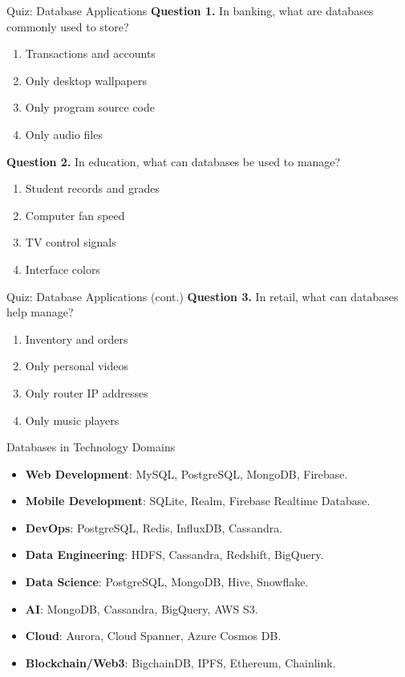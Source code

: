 \documentclass[aspectratio=169,11pt]{beamer}
\newcommand{\tightlist}{\setlength{\itemsep}{2pt}\setlength{\parskip}{0pt}}
\newcommand{\qoption}[2]{\item[#1.] #2}
\begin{document}
\begin{frame}{Quiz: Database Applications}
\small
\textbf{Question 1.} In banking, what are databases commonly used to store?
\begin{enumerate}
\tightlist
  \qoption{A}{Transactions and accounts}
  \qoption{B}{Only desktop wallpapers}
  \qoption{C}{Only program source code}
  \qoption{D}{Only audio files}
\end{enumerate}

\textbf{Question 2.} In education, what can databases be used to manage?
\begin{enumerate}
\tightlist
  \qoption{A}{Student records and grades}
  \qoption{B}{Computer fan speed}
  \qoption{C}{TV control signals}
  \qoption{D}{Interface colors}
\end{enumerate}
\end{frame}

\begin{frame}{Quiz: Database Applications (cont.)}
\small
\textbf{Question 3.} In retail, what can databases help manage?
\begin{enumerate}
\tightlist
  \qoption{A}{Inventory and orders}
  \qoption{B}{Only personal videos}
  \qoption{C}{Only router IP addresses}
  \qoption{D}{Only music players}
\end{enumerate}
\end{frame}

\begin{frame}{Databases in Technology Domains}
\small
\begin{itemize}
\tightlist
  \item \textbf{Web Development}: MySQL, PostgreSQL, MongoDB, Firebase.
  \item \textbf{Mobile Development}: SQLite, Realm, Firebase Realtime Database.
  \item \textbf{DevOps}: PostgreSQL, Redis, InfluxDB, Cassandra.
  \item \textbf{Data Engineering}: HDFS, Cassandra, Redshift, BigQuery.
  \item \textbf{Data Science}: PostgreSQL, MongoDB, Hive, Snowflake.
  \item \textbf{AI}: MongoDB, Cassandra, BigQuery, AWS S3.
  \item \textbf{Cloud}: Aurora, Cloud Spanner, Azure Cosmos DB.
  \item \textbf{Blockchain/Web3}: BigchainDB, IPFS, Ethereum, Chainlink.
\end{itemize}
\end{frame}
\end{document}
